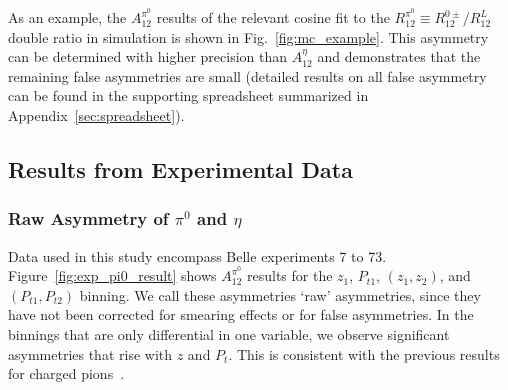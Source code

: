 As an example, the $A_{12}^{\pi^{0}}$ results of the relevant cosine fit to the $R_{12}^{\pi^0}\equiv R_{12}^{0\pm}/R_{12}^L$ double ratio in simulation is shown in Fig.~\ref{fig:mc_example}. 
This asymmetry can be determined with higher precision than $A_{12}^{\eta}$ and demonstrates that the remaining false asymmetries are small (detailed results on all false asymmetry can be found in the supporting spreadsheet summarized in Appendix~\ref{sec:spreadsheet}).




\subsection{Results from Experimental Data}
\label{sec:resultsfromexp}
\subsubsection{\texorpdfstring{Raw Asymmetry of $\pi^0$ and $\eta$}{Raw Asymmetry of pi0 and eta}}
Data used in this study encompass Belle experiments  7 to 73.
Figure~\ref{fig:exp_pi0_result} shows  $A_{12}^{\pi^0}$ results for the $z_1$, $P_{t1}$, $(z_1,z_2)$, and $(P_{t1},P_{t2})$ binning. We call these asymmetries `raw' asymmetries, since they have not been corrected for smearing effects or for false asymmetries. 
In the binnings that are only differential in one variable, we observe significant asymmetries that rise with $z$ and $P_{t}$. This is consistent with the previous results for charged pions~\cite{ChargedPionResult2, ChargedPionResult}.

